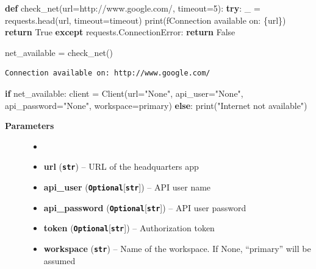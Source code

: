 \documentclass[
  letterpaper,
  DIV=11,
  numbers=noendperiod]{scrreprt}
\newenvironment{Shaded}{\begin{snugshade}}{\end{snugshade}}
\newcommand{\BuiltInTok}[1]{\textcolor[rgb]{0.00,0.23,0.31}{#1}}
\newcommand{\ControlFlowTok}[1]{\textcolor[rgb]{0.00,0.23,0.31}{\textbf{#1}}}
\newcommand{\DecValTok}[1]{\textcolor[rgb]{0.68,0.00,0.00}{#1}}
\newcommand{\KeywordTok}[1]{\textcolor[rgb]{0.00,0.23,0.31}{\textbf{#1}}}
\newcommand{\NormalTok}[1]{\textcolor[rgb]{0.00,0.23,0.31}{#1}}
\newcommand{\OperatorTok}[1]{\textcolor[rgb]{0.37,0.37,0.37}{#1}}
\newcommand{\PreprocessorTok}[1]{\textcolor[rgb]{0.68,0.00,0.00}{#1}}
\newcommand{\SpecialCharTok}[1]{\textcolor[rgb]{0.37,0.37,0.37}{#1}}
\newcommand{\SpecialStringTok}[1]{\textcolor[rgb]{0.13,0.47,0.30}{#1}}
\newcommand{\StringTok}[1]{\textcolor[rgb]{0.13,0.47,0.30}{#1}}
\newcommand{\VariableTok}[1]{\textcolor[rgb]{0.07,0.07,0.07}{#1}}
\begin{document}
\label{functions}
\begin{Shaded}
\begin{Highlighting}[]
\KeywordTok{def}\NormalTok{ check\_net(url}\OperatorTok{=}\StringTok{\textquotesingle{}http://www.google.com/\textquotesingle{}}\NormalTok{, timeout}\OperatorTok{=}\DecValTok{5}\NormalTok{):}
    \ControlFlowTok{try}\NormalTok{:}
\NormalTok{        \_ }\OperatorTok{=}\NormalTok{ requests.head(url, timeout}\OperatorTok{=}\NormalTok{timeout)}
        \BuiltInTok{print}\NormalTok{(}\SpecialStringTok{f\textquotesingle{}Connection available on: }\SpecialCharTok{\{}\NormalTok{url}\SpecialCharTok{\}}\SpecialStringTok{\textquotesingle{}}\NormalTok{)}
        \ControlFlowTok{return} \VariableTok{True}
    \ControlFlowTok{except}\NormalTok{ requests.}\PreprocessorTok{ConnectionError}\NormalTok{:}
        \ControlFlowTok{return} \VariableTok{False}
    
\NormalTok{net\_available }\OperatorTok{=}\NormalTok{ check\_net()}
\end{Highlighting}
\end{Shaded}

\begin{verbatim}
Connection available on: http://www.google.com/
\end{verbatim}

\begin{Shaded}
\begin{Highlighting}[]
\ControlFlowTok{if}\NormalTok{ net\_available:}
\NormalTok{  client }\OperatorTok{=}\NormalTok{ Client(url}\OperatorTok{=}\StringTok{"None"}\NormalTok{, }
\NormalTok{  api\_user}\OperatorTok{=}\StringTok{"None"}\NormalTok{, }
\NormalTok{  api\_password}\OperatorTok{=}\StringTok{"None"}\NormalTok{, }
\NormalTok{  workspace}\OperatorTok{=}\StringTok{\textquotesingle{}primary\textquotesingle{}}\NormalTok{)}
\ControlFlowTok{else}\NormalTok{:}
  \BuiltInTok{print}\NormalTok{(}\StringTok{"Internet not available"}\NormalTok{)}
\end{Highlighting}
\end{Shaded}

\begin{description}
\item[\textbf{Parameters}]
\begin{itemize}
\item[]
\item
  \textbf{url} (\textbf{\texttt{str}}) -- URL of the headquarters app
\item
  \textbf{api\_user}
  (\textbf{\texttt{Optional}}{[}\textbf{\texttt{str}}{]}) -- API user
  name
\item
  \textbf{api\_password}
  (\textbf{\texttt{Optional}}{[}\textbf{\texttt{str}}{]}) -- API user
  password
\item
  \textbf{token} (\textbf{\texttt{Optional}}{[}\textbf{\texttt{str}}{]})
  -- Authorization token
\item
  \textbf{workspace} (\textbf{\texttt{str}}) -- Name of the workspace.
  If None, ``primary'' will be assumed
\end{itemize}
\end{description}
\end{document}
